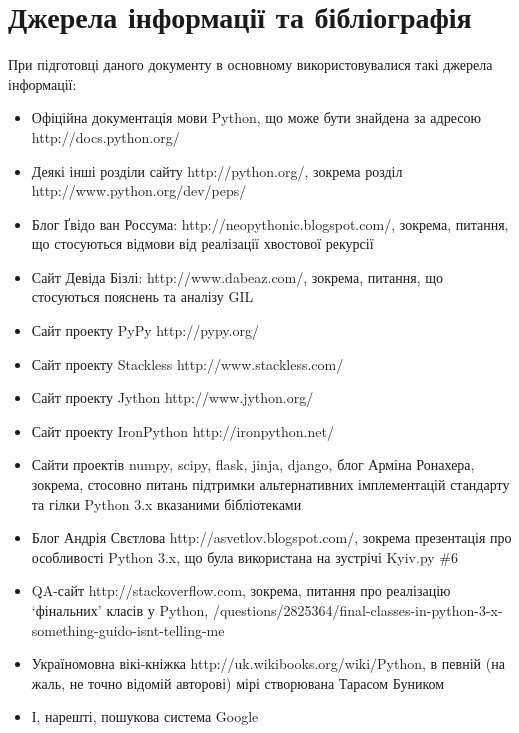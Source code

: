 \documentclass[a4paper, 12pt, onsedie]{article}
\begin{document}
\section{Джерела інформації та бібліографія}
    При підготовці даного документу в основному використовувалися такі джерела інформації:
    \begin{itemize}
        \item Офіційна документація мови Python, що може бути знайдена за адресою\\ 
              http://docs.python.org/
        \item Деякі інші розділи сайту http://python.org/, зокрема розділ\\
              http://www.python.org/dev/peps/
        \item Блог Ґвідо ван Россума: http://neopythonic.blogspot.com/, зокрема, питання, 
              що стосуються відмови від реалізації хвостової рекурсії
        \item Сайт Девіда Бізлі: http://www.dabeaz.com/, зокрема, питання, що стосуються
              пояснень та аналізу GIL
        \item Сайт проекту PyPy http://pypy.org/
        \item Сайт проекту Stackless http://www.stackless.com/
        \item Сайт проекту Jython http://www.jython.org/
        \item Сайт проекту IronPython http://ironpython.net/
        \item Сайти проектів numpy, scipy, flask, jinja, django, блог Арміна Ронахера,
              зокрема, стосовно питань підтримки альтернативних імплементацій стандарту
              та гілки Python 3.x вказаними бібліотеками
        \item Блог Андрія Свєтлова http://asvetlov.blogspot.com/, зокрема презентація про
              особливості Python 3.x, що була використана на зустрічі Kyiv.py \#6
        \item QA-сайт http://stackoverflow.com, зокрема, питання про реалізацію `фінальних'
              класів у Python, /questions/2825364/final-classes-in-python-3-x-something-guido-isnt-telling-me
        \item Україномовна вікі-кніжка http://uk.wikibooks.org/wiki/Python, в певній (на жаль, 
              не точно відомій авторові) мірі створювана Тарасом Буником
        \item І, нарешті, пошукова система Google
    \end{itemize}
\end{document}
